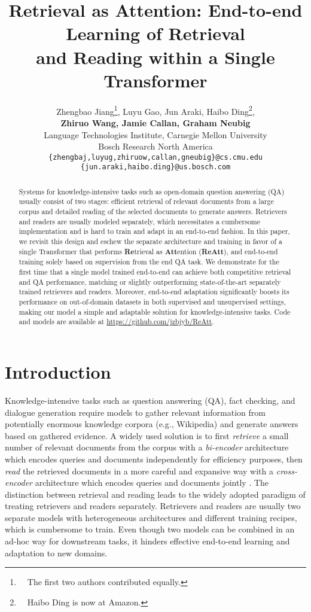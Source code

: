 \documentclass[11pt, dvipsnames]{article}
\title{Retrieval as Attention: End-to-end Learning of Retrieval \\ and Reading within a Single Transformer}
\author{Zhengbao Jiang\thanks{~~The first two authors contributed equally.}, \quad Luyu Gao\footnotemark[1], \quad Jun Araki, \quad Haibo Ding\thanks{~~Haibo Ding is now at Amazon.}, \\
{ \bf Zhiruo Wang, \quad Jamie Callan, \quad Graham Neubig } \\
Language Technologies Institute, Carnegie Mellon University \\
Bosch Research North America \\
\texttt{\{zhengbaj,luyug,zhiruow,callan,gneubig\}@cs.cmu.edu} \\
\texttt{\{jun.araki,haibo.ding\}@us.bosch.com}}
\newcommand{\ours}{ReAtt\xspace}
\begin{document}
\maketitle
\begin{abstract}
Systems for knowledge-intensive tasks such as open-domain question answering (QA) usually consist of two stages: efficient retrieval of relevant documents from a large corpus and detailed reading of the selected documents to generate answers.
Retrievers and readers are usually modeled separately, which necessitates a cumbersome implementation and is hard to train and adapt in an end-to-end fashion.
In this paper, we revisit this design and eschew the separate architecture and training in favor of a single Transformer that performs \textbf{Re}trieval as \textbf{Att}ention (\textbf{\ours}), and end-to-end training solely based on supervision from the end QA task.
We demonstrate for the first time that a single model trained end-to-end can achieve both competitive retrieval and QA performance, matching or slightly outperforming state-of-the-art separately trained retrievers and readers.
Moreover, end-to-end adaptation significantly boosts its performance on out-of-domain datasets in both supervised and unsupervised settings, making our model a simple and adaptable solution for knowledge-intensive tasks.
Code and models are available at \url{https://github.com/jzbjyb/ReAtt}.
\end{abstract}

\section{Introduction}
Knowledge-intensive tasks such as question answering (QA), fact checking, and dialogue generation require models to gather relevant information from potentially enormous knowledge corpora (e.g., Wikipedia) and generate answers based on gathered evidence.
A widely used solution is to first \emph{retrieve} a small number of relevant documents from the corpus with a \emph{bi-encoder} architecture which encodes queries and documents independently for efficiency purposes, then \emph{read} the retrieved documents in a more careful and expansive way with a \emph{cross-encoder} architecture which encodes queries and documents jointly \cite{orqa-2019-lee,realm-2020-guu,rag-2020-lewis,atlas-2022-izacard}.
The distinction between retrieval and reading leads to the widely adopted paradigm of treating retrievers and readers separately.
Retrievers and readers are usually two separate models with heterogeneous architectures and different training recipes, which is cumbersome to train.
Even though two models can be combined in an ad-hoc way for downstream tasks, it hinders effective end-to-end learning and adaptation to new domains.
\end{document}
